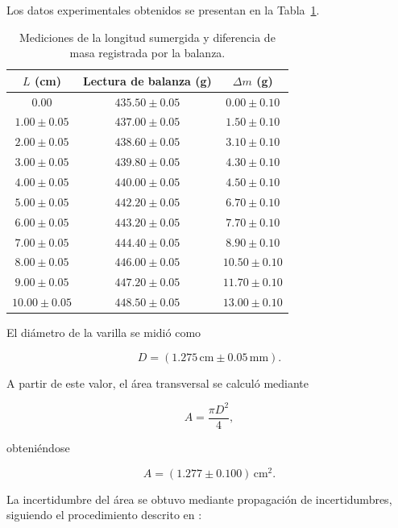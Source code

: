 Los datos experimentales obtenidos se presentan en la Tabla~\ref{tab:datos_arq}.

\begin{table}[htbp]
\centering
\caption{Mediciones de la longitud sumergida y diferencia de masa registrada por la balanza.}
\label{tab:datos_arq}
\begin{tabular}{ccc}
\hline
$L$ (cm) & Lectura de balanza (g) & $\Delta m$ (g) \\
\hline
$0.00$ & $435.50 \pm 0.05$ & $0.00 \pm 0.10$ \\
$1.00 \pm 0.05$ & $437.00 \pm 0.05$ & $1.50 \pm 0.10$ \\
$2.00 \pm 0.05$ & $438.60 \pm 0.05$ & $3.10 \pm 0.10$ \\
$3.00 \pm 0.05$ & $439.80 \pm 0.05$ & $4.30 \pm 0.10$ \\
$4.00 \pm 0.05$ & $440.00 \pm 0.05$ & $4.50 \pm 0.10$ \\
$5.00 \pm 0.05$ & $442.20 \pm 0.05$ & $6.70 \pm 0.10$ \\
$6.00 \pm 0.05$ & $443.20 \pm 0.05$ & $7.70 \pm 0.10$ \\
$7.00 \pm 0.05$ & $444.40 \pm 0.05$ & $8.90 \pm 0.10$ \\
$8.00 \pm 0.05$ & $446.00 \pm 0.05$ & $10.50 \pm 0.10$ \\
$9.00 \pm 0.05$ & $447.20 \pm 0.05$ & $11.70 \pm 0.10$ \\
$10.00 \pm 0.05$ & $448.50 \pm 0.05$ & $13.00 \pm 0.10$ \\
\hline
\end{tabular}
\end{table}

El diámetro de la varilla se midió como

\begin{equation}
D=(1.275\,\mathrm{cm}\pm0.05\,\mathrm{mm}).
\end{equation}

A partir de este valor, el área transversal se calculó mediante

\begin{equation}
A=\frac{\pi D^2}{4},
\end{equation}

obteniéndose

\begin{equation}
A=(1.277\pm0.100)\,\mathrm{cm^2}.
\end{equation}

La incertidumbre del área se obtuvo mediante propagación de incertidumbres, siguiendo el procedimiento descrito en \cite{taylor1997}:

